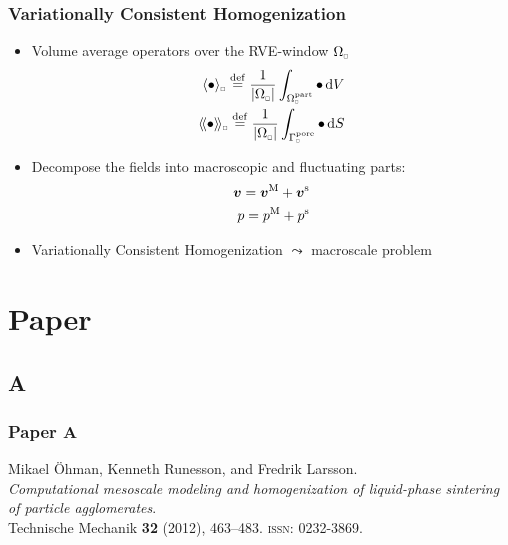 \documentclass[11pt]{beamer} %
\DeclarePairedDelimiter{\homgen}{\langle}{\rangle_\rve}
\DeclarePairedDelimiter{\shomgen}{\langle\!\langle}{\rangle\!\rangle_\rve}
\newcommand{\volume}{|\Omega_\rve|}
\newcommand{\pore}{\mathrm{pore}}
\newcommand{\particle}{\mathrm{part}}
\newcommand{\rve}{
  {\mathchoice
   {\mbox{\scalebox{0.67}{$\Box$}}}
   {\mbox{\scalebox{0.67}{$\Box$}}}
   {\mbox{\scalebox{0.5}{$\Box$}}}
   {\mbox{\scalebox{0.375}{$\Box$}}}
  }
}
\begin{document}
\begin{frame}
 \frametitle{Variationally Consistent Homogenization}
\begin{itemize}
 \item Volume average operators over the RVE-window $\Omega_\rve$
\begin{align*}
 \homgen{\bullet} \defeq \frac{1}{\volume} \int_{\Omega_\rve^\particle} \bullet \dif V%
\\
 \shomgen{\bullet} \defeq \frac{1}{\volume} \int_{\Gamma^\pore_\rve} \bullet \dif S%
\end{align*}
 \item Decompose the fields into macroscopic and fluctuating parts:
 \begin{align*}
  \boldsymbol{v} = \boldsymbol{v}^{\mathrm{M}} + \boldsymbol{v}^{\mathrm{s}}
   \\
  p = p^{\mathrm{M}} + p^{\mathrm{s}}
 \end{align*}
 \item Variationally Consistent Homogenization $\leadsto$ macroscale problem
\end{itemize}
\end{frame}




\section{Paper}
\subsection{A}
\begin{frame}
 \frametitle{Paper A}
\begin{center}
Mikael Öhman, Kenneth Runesson, and Fredrik Larsson.
\\[1em]
\textit{Computational mesoscale modeling and homogenization of liquid-phase sintering of particle agglomerates}.
\\[1em]
Technische Mechanik \textbf{32} (2012), 463--483. \textsc{issn}: 0232-3869.
\end{center}
\end{frame}
\end{document}
